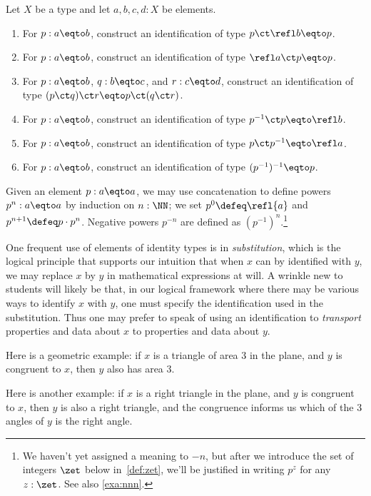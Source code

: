 \begin{xca}\label{xca:path-groupoid-laws}
  Let $X$ be a type and let $a,b,c,d:X$ be elements.
  \begin{enumerate}
    \item For $p:a \eqto b$, construct an identification of type $p \ct \refl b \eqto p$.
    \item For $p:a \eqto b$, construct an identification of type $\refl a \ct p \eqto p$.
    \item For $p:a \eqto b$, $q:b \eqto c$, and $r:c \eqto d$, construct an identification of type $(p \ct q) \ct r \eqto p \ct (q \ct r)$.
    \item For $p:a \eqto b$, construct an identification of type $p^{-1} \ct p \eqto \refl b$.
    \item For $p:a \eqto b$, construct an identification of type $p \ct p^{-1} \eqto \refl a$.
    \item For $p:a \eqto b$, construct an identification of type $(p^{-1})^{-1} \eqto p$.
    \qedhere
  \end{enumerate}
\end{xca}

Given an element $p:a \eqto a$, we may use concatenation to define powers $p^n : a \eqto a$
by induction on $n:\NN$; we set $p^0\defeq\refl{a}$ and
$p^{n+1}\defeq p\cdot p^n$. Negative powers $p^{-n}$ are defined
as $(p^{-1})^n$.\footnote{We haven't yet assigned a meaning to $-n$,
  but after we introduce the set of integers $\zet$ below in~\cref{def:zet},
  we'll be justified in writing $p^z$ for any $z:\zet$.  See also \cref{exa:nnn}.}

One frequent use of elements of identity types is in \emph{substitution}, which is
the logical principle that supports our intuition that when $x$ can by identified with $y$, we may replace $x$ by $y$
in mathematical expressions at will.  A wrinkle new to students will likely be that, in our logical framework
where there may be various ways to identify $x$ with $y$, one must specify the identification used in the substitution.
Thus one may prefer to speak of using an identification to \emph{transport} properties and data about $x$ to properties and data about $y$.

Here is a geometric example: if $x$ is a triangle of area $3$ in the plane, and $y$ is congruent to $x$, then $y$ also has area $3$.

Here is another example: if $x$ is a right triangle in the plane, and $y$ is congruent to $x$, then $y$ is also a right triangle, and
the congruence informs us which of the $3$ angles of $y$ is the right angle.


